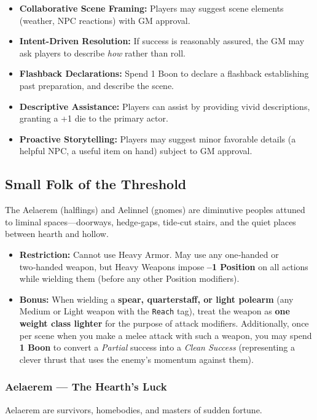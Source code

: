 \begin{itemize}
  \item \textbf{Collaborative Scene Framing:} Players may suggest scene elements (weather, NPC reactions) with GM approval.
  \item \textbf{Intent-Driven Resolution:} If success is reasonably assured, the GM may ask players to describe \textit{how} rather than roll.
  \item \textbf{Flashback Declarations:} Spend 1 Boon to declare a flashback establishing past preparation, and describe the scene.
  \item \textbf{Descriptive Assistance:} Players can assist by providing vivid descriptions, granting a +1 die to the primary actor.
  \item \textbf{Proactive Storytelling:} Players may suggest minor favorable details (a helpful NPC, a useful item on hand) subject to GM approval.
\end{itemize}

\subsection{Small Folk of the Threshold}
\label{sec:small-folk}

The Aelaerem (halflings) and Aelinnel (gnomes) are diminutive peoples attuned to liminal spaces—doorways, hedge‑gaps, tide‑cut stairs, and the quiet places between hearth and hollow.

\begin{itemize}
  \item \textbf{Restriction:} Cannot use Heavy Armor. May use any one‑handed or two‑handed weapon, but Heavy Weapons impose \textbf{–1 Position} on all actions while wielding them (before any other Position modifiers).
  \item \textbf{Bonus:} When wielding a \textbf{spear, quarterstaff, or light polearm} (any Medium or Light weapon with the \texttt{Reach} tag), treat the weapon as \textbf{one weight class lighter} for the purpose of attack modifiers. Additionally, once per scene when you make a melee attack with such a weapon, you may spend \textbf{1 Boon} to convert a \textit{Partial} success into a \textit{Clean Success} (representing a clever thrust that uses the enemy’s momentum against them).
\end{itemize}

\subsubsection*{Aelaerem — The Hearth’s Luck}
\label{sec:aelaerem}
Aelaerem are survivors, homebodies, and masters of sudden fortune.

